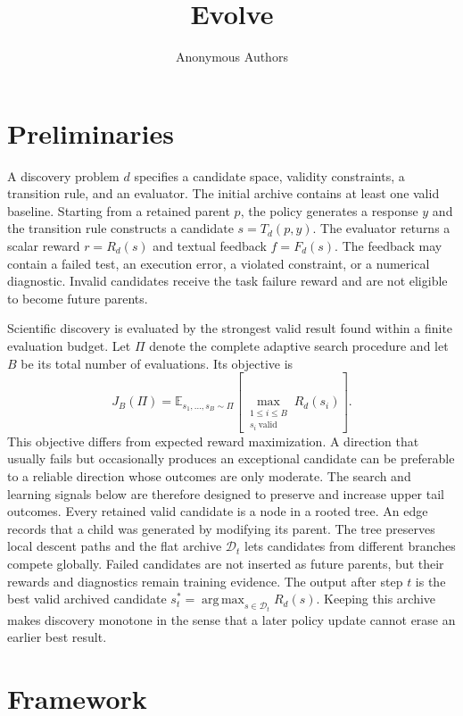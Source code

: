 \documentclass{article}
\title{Evolve}
\author{Anonymous Authors}
\date{}
\newcommand{\Dset}{\mathcal{D}}
\newcommand{\valid}{\mathrm{valid}}
\begin{document}
\maketitle

\section{Preliminaries}
\label{secpreliminaries}

A discovery problem $d$ specifies a candidate space, validity constraints, a transition rule, and an evaluator. The initial archive contains at least one valid baseline. Starting from a retained parent $p$, the policy generates a response $y$ and the transition rule constructs a candidate $s=T_d(p,y)$. The evaluator returns a scalar reward $r=R_d(s)$ and textual feedback $f=F_d(s)$. The feedback may contain a failed test, an execution error, a violated constraint, or a numerical diagnostic. Invalid candidates receive the task failure reward and are not eligible to become future parents.

Scientific discovery is evaluated by the strongest valid result found within a finite evaluation budget. Let $\Pi$ denote the complete adaptive search procedure and let $B$ be its total number of evaluations. Its objective is
\begin{equation}
J_B(\Pi)
=
\mathbb{E}_{s_1,\ldots,s_B\sim\Pi}
\left[
\max_{\substack{1\leq i\leq B\\s_i\ \valid}}
R_d(s_i)
\right].
\label{eqobjective}
\end{equation}
This objective differs from expected reward maximization. A direction that usually fails but occasionally produces an exceptional candidate can be preferable to a reliable direction whose outcomes are only moderate. The search and learning signals below are therefore designed to preserve and increase upper tail outcomes.
Every retained valid candidate is a node in a rooted tree. An edge records that a child was generated by modifying its parent. The tree preserves local descent paths and the flat archive $\Dset_t$ lets candidates from different branches compete globally. Failed candidates are not inserted as future parents, but their rewards and diagnostics remain training evidence. The output after step $t$ is the best valid archived candidate $s_t^*=\operatorname*{arg\,max}_{s\in\Dset_t}R_d(s)$. Keeping this archive makes discovery monotone in the sense that a later policy update cannot erase an earlier best result.

\section{Framework}
\label{secframework}
\end{document}

